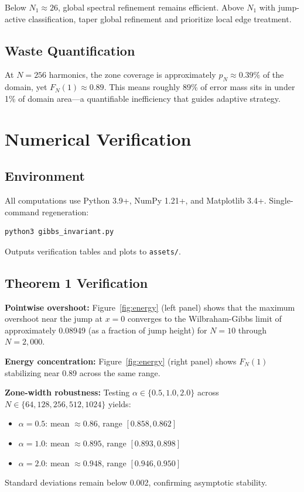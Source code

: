 \documentclass[11pt,letterpaper]{article}
\theoremstyle{remark}
\begin{document}
Below $N_1 \approx 26$, global spectral refinement remains efficient. Above $N_1$ with jump-active classification, taper global refinement and prioritize local edge treatment.

\subsection{Waste Quantification}

At $N = 256$ harmonics, the zone coverage is approximately $p_N \approx 0.39\%$ of the domain, yet $F_N(1) \approx 0.89$. This means roughly 89\% of error mass sits in under 1\% of domain area---a quantifiable inefficiency that guides adaptive strategy.

\section{Numerical Verification}

\subsection{Environment}

All computations use Python 3.9+, NumPy 1.21+, and Matplotlib 3.4+. Single-command regeneration:
\begin{verbatim}
python3 gibbs_invariant.py
\end{verbatim}
Outputs verification tables and plots to \texttt{assets/}.

\subsection{Theorem 1 Verification}

\textbf{Pointwise overshoot:} Figure~\ref{fig:energy} (left panel) shows that the maximum overshoot near the jump at $x = 0$ converges to the Wilbraham-Gibbs limit of approximately 0.08949 (as a fraction of jump height) for $N = 10$ through $N = 2{,}000$.

\textbf{Energy concentration:} Figure~\ref{fig:energy} (right panel) shows $F_N(1)$ stabilizing near 0.89 across the same range.

\textbf{Zone-width robustness:} Testing $\alpha \in \{0.5, 1.0, 2.0\}$ across $N \in \{64, 128, 256, 512, 1024\}$ yields:
\begin{itemize}[nosep]
\item $\alpha = 0.5$: mean $\approx 0.86$, range $[0.858, 0.862]$
\item $\alpha = 1.0$: mean $\approx 0.895$, range $[0.893, 0.898]$
\item $\alpha = 2.0$: mean $\approx 0.948$, range $[0.946, 0.950]$
\end{itemize}
Standard deviations remain below 0.002, confirming asymptotic stability.
\end{document}
